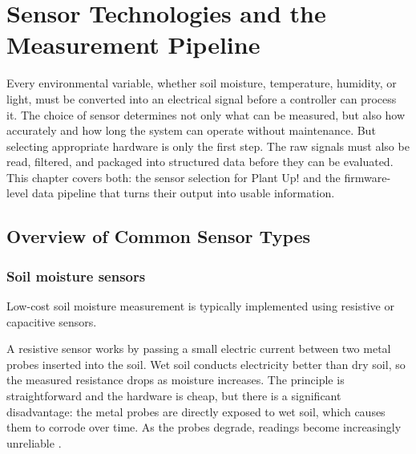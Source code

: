 ﻿\section{Sensor Technologies and the Measurement Pipeline}

Every environmental variable, whether soil moisture, temperature, humidity, or light, must be converted into an electrical signal before a controller can process it. The choice of sensor determines not only what can be measured, but also how accurately and how long the system can operate without maintenance. But selecting appropriate hardware is only the first step. The raw signals must also be read, filtered, and packaged into structured data before they can be evaluated. This chapter covers both: the sensor selection for Plant Up! and the firmware-level data pipeline that turns their output into usable information.

\subsection{Overview of Common Sensor Types}

\subsubsection*{Soil moisture sensors}

Low-cost soil moisture measurement is typically implemented using resistive or capacitive sensors.

A resistive sensor works by passing a small electric current between two metal probes inserted into the soil. Wet soil conducts electricity better than dry soil, so the measured resistance drops as moisture increases. The principle is straightforward and the hardware is cheap, but there is a significant disadvantage: the metal probes are directly exposed to wet soil, which causes them to corrode over time. As the probes degrade, readings become increasingly unreliable \cite{chowdhuryCalibration2022}.

